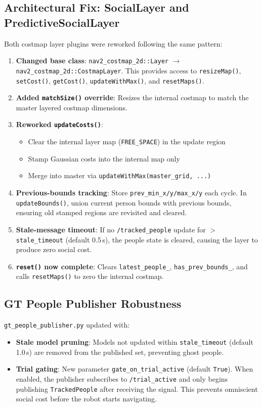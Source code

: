 \documentclass[11pt]{article}
\newcommand{\logentry}[1]{\subsection*{#1}}
\begin{document}
\logentry{Architectural Fix: SocialLayer and PredictiveSocialLayer}
Both costmap layer plugins were reworked following the same pattern:

\begin{enumerate}
  \item \textbf{Changed base class}: \texttt{nav2\_costmap\_2d::Layer} $\to$
    \texttt{nav2\_costmap\_2d::CostmapLayer}. This provides access to
    \texttt{resizeMap()}, \texttt{setCost()}, \texttt{getCost()},
    \texttt{updateWithMax()}, and \texttt{resetMaps()}.
  \item \textbf{Added \texttt{matchSize()} override}: Resizes the internal
    costmap to match the master layered costmap dimensions.
  \item \textbf{Reworked \texttt{updateCosts()}}:
    \begin{itemize}
      \item Clear the internal layer map (\texttt{FREE\_SPACE}) in the update
        region
      \item Stamp Gaussian costs into the internal map only
      \item Merge into master via \texttt{updateWithMax(master\_grid, ...)}
    \end{itemize}
  \item \textbf{Previous-bounds tracking}: Store
    \texttt{prev\_min\_x/y/max\_x/y} each cycle. In \texttt{updateBounds()},
    union current person bounds with previous bounds, ensuring old stamped
    regions are revisited and cleared.
  \item \textbf{Stale-message timeout}: If no \texttt{/tracked\_people} update
    for $>$\texttt{stale\_timeout} (default 0.5\,s), the people state is
    cleared, causing the layer to produce zero social cost.
  \item \textbf{\texttt{reset()} now complete}: Clears
    \texttt{latest\_people\_}, \texttt{has\_prev\_bounds\_}, and calls
    \texttt{resetMaps()} to zero the internal costmap.
\end{enumerate}

\logentry{GT People Publisher Robustness}
\texttt{gt\_people\_publisher.py} updated with:
\begin{itemize}
  \item \textbf{Stale model pruning}: Models not updated within
    \texttt{stale\_timeout} (default 1.0\,s) are removed from the published
    set, preventing ghost people.
  \item \textbf{Trial gating}: New parameter \texttt{gate\_on\_trial\_active}
    (default \texttt{True}). When enabled, the publisher subscribes to
    \texttt{/trial\_active} and only begins publishing \texttt{TrackedPeople}
    after receiving the signal. This prevents omniscient social cost before
    the robot starts navigating.
\end{itemize}
\end{document}
